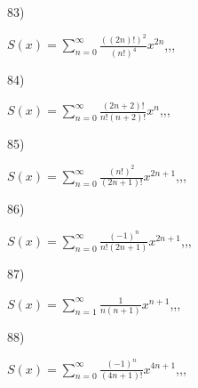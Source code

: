 \documentclass[11pt, ukrainian]{article}
\begin{document}
\par
\vspace{0.9cm}
83) \space 
{%
{$S(x)=\sum\limits_{n=0}^{\infty}{\frac{((2n)!)^2}{(n!)^4}}{x^{{2n}}}$},,, \par \smallskip  
}
\par
\vspace{0.9cm}
84) \space 
{%
{$S(x)=\sum\limits_{n=0}^{\infty}{\frac{(2n+2)!}{n!(n+2)!}}{x^{n}}$},,, \par \smallskip  
}
\par
\vspace{0.9cm}
85) \space 
{%
{$S(x)=\sum\limits_{n=0}^{\infty}{\frac{(n!)^2}{(2n+1)!}}{x^{{2n+1}}}$},,, \par \smallskip  
}
\par
\vspace{0.9cm}
86) \space 
{%
{$S(x)=\sum\limits_{n=0}^{\infty}{\frac{(-1)^n}{n!(2n+1)}}{x^{{2n+1}}}$},,, \par \smallskip  
}
\par
\vspace{0.9cm}
87) \space 
{%
{$S(x)=\sum\limits_{n=1}^{\infty}{\frac{1}{n(n+1)}}{x^{{n+1}}}$},,, \par \smallskip  
}
\par
\vspace{0.9cm}
88) \space 
{%
{$S(x)=\sum\limits_{n=0}^{\infty}{\frac{(-1)^n}{(4n+1)!}}{x^{{4n+1}}}$},,, \par \smallskip  
}
\end{document}
